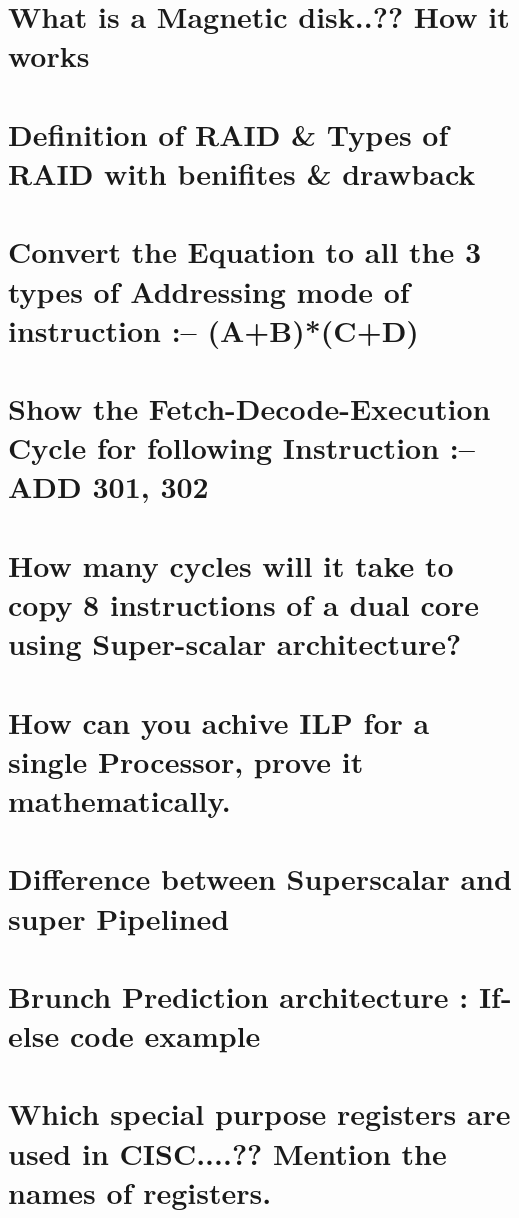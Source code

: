 \documentclass[12pt]{article}
\begin{document}
\tableofcontents
\thispagestyle{empty}
\clearpage
{}





\section{What is a Magnetic disk..?? How it works}

\section{Definition of RAID \& Types of RAID with benifites \& drawback}

\section{Convert the Equation to all the 3 types of Addressing mode of instruction :-- (A+B)*(C+D)}

\section{Show the Fetch-Decode-Execution Cycle for following Instruction :--  ADD 301, 302}

\section{How many cycles will it take to copy 8 instructions of a dual core using Super-scalar architecture? }

\section{How can you achive ILP for a single Processor, prove it mathematically. }

\section{Difference between Superscalar and super Pipelined}

\section{Brunch Prediction architecture : If-else code example}

\section{Which special purpose registers are used in CISC....??  Mention the names of registers. }
\end{document}
